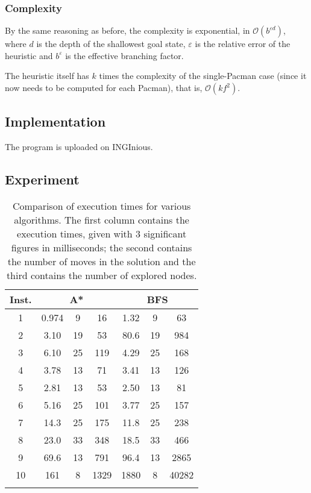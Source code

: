 \documentclass[journal]{IEEEtran}
\begin{document}
\subsubsection{Complexity}
By the same reasoning as before, the complexity is exponential, in \(\mathcal{O}(b^{\varepsilon d})\), where \(d\) is the depth of the shallowest goal state, \(\varepsilon\) is the relative error of the heuristic and \(b^\varepsilon\) is the effective branching factor.

The heuristic itself has \(k\) times the complexity of the single-Pacman case (since it now needs to be computed for each Pacman), that is, \(\mathcal{O}(kf^2)\).

\subsection{Implementation}
The program is uploaded on INGInious.

\subsection{Experiment}
\begin{table}[!hbtp]
	\centering
	\begin{tabular}{c@{\hspace{0.7cm}}ccc|ccc} 
		\toprule
		Inst. & \multicolumn{3}{c}{A*} & \multicolumn{3}{c}{BFS} \\
		\midrule
		1 & 0.974 & 9 & 16  & 1.32 & 9 & 63 \\
		2 & 3.10 & 19 & 53 & 80.6 & 19 & 984 \\
		3 & 6.10 & 25 & 119 & 4.29 & 25 & 168 \\
		4 & 3.78 & 13 & 71 & 3.41 & 13 & 126 \\
		5 & 2.81 & 13 & 53 & 2.50 & 13 & 81 \\
		6 & 5.16 & 25 & 101 & 3.77 & 25 & 157 \\
		7 & 14.3 & 25 & 175 & 11.8 & 25 & 238 \\
		8 & 23.0 & 33 & 348 & 18.5 & 33 & 466 \\
		9 & 69.6 & 13 & 791  & 96.4 & 13 & 2865 \\
		10 & 161 & 8 & 1329 & 1880 & 8 & 40282 \\
		\bottomrule \\
	\end{tabular}
	\caption{Comparison of execution times for various algorithms.
		The first column contains the execution times, given with 3 significant figures in milliseconds; the second contains the number of moves in the solution and the third contains the number of explored nodes.}
	\label{time1}
\end{table}
\end{document}
